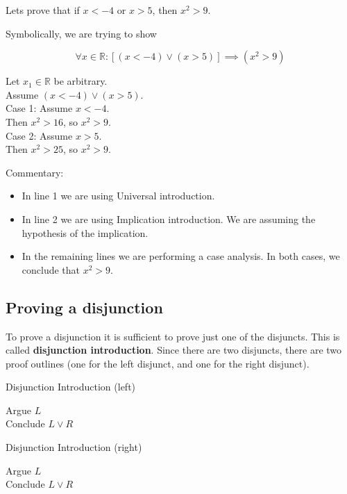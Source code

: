 \begin{example}
		Lets prove that if $x<-4$ or $x>5$, then $x^2 > 9$.
		
		Symbolically, we are trying to show
		
		\[
		\forall x \in \mathbb{R}: [(x< -4) \vee (x>5)] \implies (x^2 >9)
		\] 
		
		\begin{fitch}
				\textrm{Let $x_1 \in \mathbb{R}$ be arbitrary.}\\
				\textrm{Assume $(x< -4) \vee (x>5)$.}\\
				\fa \textrm{Case 1:  Assume $x< -4$.}\\
				\fa \fa \textrm{Then $x^2 > 16$, so $x^2 > 9$.}\\
				\fa \textrm{Case 2:  Assume $x>5$.}\\
				\fa \fa \textrm{Then $x^2> 25$, so $x^2 > 9$.}
			\end{fitch}
		
		Commentary:
		
		\begin{itemize}
				\item In line 1 we are using Universal introduction.
				\item In line 2 we are using Implication introduction.  We are assuming the hypothesis of the implication.
				\item In the remaining lines we are performing a case analysis.  In both cases, we conclude that $x^2>9$.
			\end{itemize}
	\end{example}


\subsection{Proving a disjunction}

To prove a disjunction it is sufficient to prove just one of the disjuncts.  This is called \textbf{disjunction introduction}.  Since there are two disjuncts, there are two proof outlines (one for the left disjunct, and one for the right disjunct).


Disjunction Introduction (left)

\begin{fitch*}
	\textrm{Argue $L$}\\
	\textrm{Conclude $L \vee R$}
\end{fitch*}

Disjunction Introduction (right)

\begin{fitch*}
	\textrm{Argue  $L$}\\
	\textrm{Conclude $L \vee R$}
\end{fitch*}

